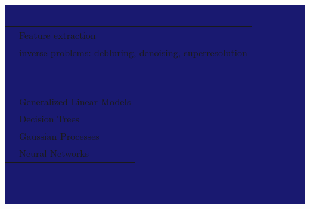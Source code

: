 \documentclass[letterpaper]{article}
\begin{document}
\begin{minipage}{1.\linewidth}
\colorbox{MidnightBlue}{
\begin{minipage}{0.47\linewidth} %
	\begin{minipage}{1\linewidth}
		\centering{\huge\textmd{\textcolor{white}{Engineering}}}
		\vspace{2ex}
	\end{minipage}
	\begin{minipage}{1\linewidth} %
		\begin{minipage}{0.47\linewidth}
			\centering{\Large\textmd{\textcolor{white}{Signal Processing}}}\\
			\vspace{1ex}
			\begin{minipage}{1\linewidth}
				\small\textcolor{white}{
				\begin{tabularx}{1\textwidth}{cX}
					& Feature extraction \\
					& inverse problems: debluring, denoising, superresolution\\
				\end{tabularx}
				} 
			\end{minipage}
			\vspace{2ex}
		\end{minipage}
		\hfill
		\begin{minipage}{0.47\linewidth}
			\centering{\Large\textmd{\textcolor{white}{Supervised Learning}}}\\
			\vspace{1ex}
			\begin{minipage}{1\linewidth}
				\small\textcolor{white}{
				\begin{tabularx}{1\textwidth}{cX}
					& Generalized Linear Models\\
					& Decision Trees\\
					& Gaussian Processes\\
					& Neural Networks\\
				\end{tabularx}
				} 
			\end{minipage}
			\vspace{2ex}
		\end{minipage}
	\end{minipage}\\ %
	\begin{minipage}{1\linewidth} %
		\begin{minipage}{0.47\linewidth}
			\centering{\Large\textmd{\textcolor{white}{Unsupervised 
			Learning}}}\\
			\vspace{1ex}

\end{minipage}
\end{minipage}
\end{minipage}}
\end{minipage}
\end{document}
